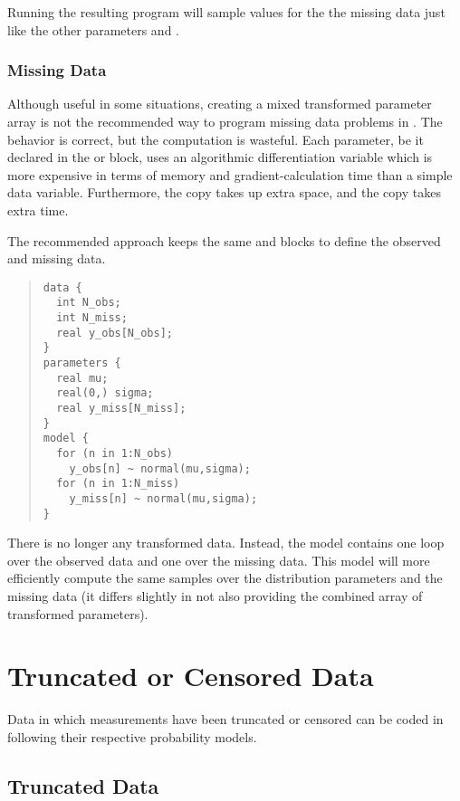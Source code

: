 Running the resulting program will sample values for the the missing
data  just like the other parameters  and
.

\subsection{Missing Data}

Although useful in some situations, creating a mixed transformed
parameter array is not the recommended way to program missing data
problems in \Stan.  The behavior is correct, but the computation is
wasteful.  Each parameter, be it declared in the  or
 block, uses an algorithmic
differentiation variable which is more expensive in terms of memory
and gradient-calculation time than a simple data variable.
Furthermore, the copy takes up extra space, and the copy takes extra
time.

The recommended approach keeps the same  and
 blocks to define the observed and missing data.
%
\begin{quote}
\begin{Verbatim}
data {
  int N_obs;
  int N_miss;
  real y_obs[N_obs];
}
parameters {
  real mu;
  real(0,) sigma;
  real y_miss[N_miss];
}
model {
  for (n in 1:N_obs)
    y_obs[n] ~ normal(mu,sigma);
  for (n in 1:N_miss)
    y_miss[n] ~ normal(mu,sigma);
}
\end{Verbatim}
\end{quote}
%
There is no longer any transformed data.  Instead, the model contains
one loop over the observed data and one over the missing data.  This
model will more efficiently compute the same samples over the
distribution parameters and the missing data (it differs slightly in
not also providing the combined array  of transformed parameters).




\chapter{Truncated or Censored Data}

Data in which measurements have been truncated or censored can be
coded in \Stan following their respective probability models.

\section{Truncated Data}


